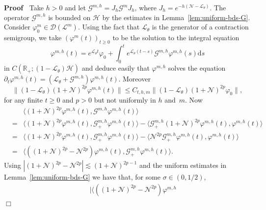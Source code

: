 \documentclass[10pt]{article}
\newcommand{\mathd}{\mathrm{d}}
\newenvironment{proof}{\noindent\textbf{Proof\ }}{\hspace*{\fill}$\Box$\medskip}
\begin{document}
\begin{proof}
  Take $h > 0$ and let $\mathcal{G}^{m, h} = J_h \mathcal{G}^m J_h$, where
  $J_h = e^{- h (\mathcal{N}-\mathcal{L}_{\theta})}$. The operator
  $\mathcal{G}^{m, h}$ is bounded on $\mathcal{H}$ by the estimates in
  Lemma~\ref{lem:uniform-bds-G}. Consider $\varphi_0^m \in \mathcal{D}
  (\mathcal{L}^m)$. Using the fact that $\mathcal{L}_{\theta}$ is the
  generator of a contraction semigroup, we take $(\varphi^m (t))_{t \geqslant
  0}$ to be the solution to the integral equation
  \begin{equation}
    \varphi^{m, h} (t) = e^{\mathcal{L}_{\theta} t} \varphi_0 + \int_0^t
    e^{\mathcal{L}_{\theta} (t - s)} \mathcal{G}^{m, h} \varphi^{m, h} (s)
    \mathd s \label{eq:duhamel-mh}
  \end{equation}
  in $C (\mathbb{R}_+ ; (1 -\mathcal{L}_{\theta}) \mathcal{H})$ and deduce
  easily that $\varphi^{m, h}$ solves the equation $\partial_t \varphi^{m, h}
  (t) = (\mathcal{L}_{\theta} +\mathcal{G}^{m, h}) \varphi^{m, h} (t)$.
  Moreover
  \[ \| (1 -\mathcal{L}_{\theta}) (1 +\mathcal{N})^{2 p} \varphi^{m, h} (t) \|
     \leqslant C_{t, h, m} \| (1 -\mathcal{L}_{\theta}) (1 +\mathcal{N})^{2 p}
     \varphi_0 \|, \]
  for any finite $t \geqslant 0$ and $p > 0$ but not uniformly in $h$ and~$m$.
  Now
  \begin{eqnarray*}
    &  & \langle (1 +\mathcal{N})^{2 p} \varphi^{m, h} (t), \mathcal{G}^{m,
    h} \varphi^{m, h} (t) \rangle\\
    & = & \langle (1 +\mathcal{N})^{2 p} \varphi^{m, h} (t), \mathcal{G}^{m,
    h}_+ \varphi^{m, h} (t) \rangle - \langle \mathcal{G}^{m, h}_+ (1
    +\mathcal{N})^{2 p} \varphi^{m, h} (t), \varphi^{m, h} (t) \rangle\\
    & = & \langle (1 +\mathcal{N})^{2 p} \varphi^{m, h} (t), \mathcal{G}^{m,
    h}_+ \varphi^{m, h} (t) \rangle - \langle \mathcal{N}^{2 p}
    \mathcal{G}^{m, h}_+ \varphi^{m, h} (t), \varphi^{m, h} (t) \rangle\\
    & = & \langle ((1 +\mathcal{N})^{2 p} -\mathcal{N}^{2 p}) \varphi^{m, h}
    (t), \mathcal{G}^{m, h}_+ \varphi^{m, h} (t) \rangle .
  \end{eqnarray*}
  Using $| (1 +\mathcal{N})^{2 p} -\mathcal{N}^{2 p} | \lesssim (1
  +\mathcal{N})^{2 p - 1}$ and the uniform estimates in
  Lemma~\ref{lem:uniform-bds-G} we have that, for some $\sigma \in (0, 1 /
  2)$,
  \begin{eqnarray*}
    &  & | \langle ((1 +\mathcal{N})^{2 p} -\mathcal{N}^{2 p}) \varphi^{m, h}

\end{eqnarray*}
\end{proof}
\end{document}
